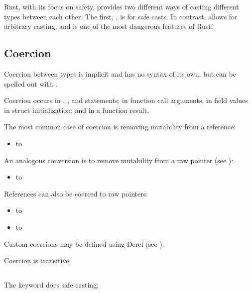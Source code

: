 Rust, with its focus on safety, provides two different ways of casting different types between each other. The first, , is 
for safe casts. In contrast,  allows for arbitrary casting, and is one of the most dangerous features of Rust!

\subsection*{Coercion}

Coercion between types is implicit and has no syntax of its own, but can be spelled out with .

\blank

Coercion occurs in \keylet, , and  statements; in function call arguments; in field values in struct 
initialization; and in a function result.

\blank

The most common case of coercion is removing mutability from a reference:

\begin{itemize}
  \item{ to }
\end{itemize}

An analogous conversion is to remove mutability from a raw pointer (see ):

\begin{itemize}
  \item{ to }
\end{itemize}

References can also be coerced to raw pointers:

\begin{itemize}
  \item{ to }
  \item{ to }
\end{itemize}

Custom coercions may be defined using Deref (see ).

\blank

Coercion is transitive.

\subsection*{}

The  keyword does safe casting:

